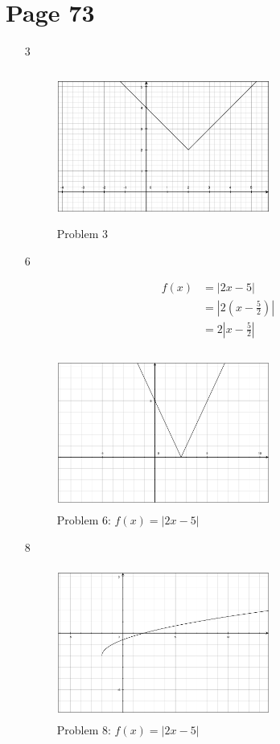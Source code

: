 \documentclass[fleqn,addpoints]{exam}
\begin{document}
\section{Page 73}
\begin{itemize}

\item[3]
\begin{figure}[H]
  \centering
  \includegraphics[width=7cm,height=5cm]{1.9-3.eps}
  \caption*{Problem 3}
\end{figure}

\item[6]

\begin{align*}
  f(x) &= |2x-5| \\
  &= \left| 2 \left( x-\frac{5}{2} \right) \right| \\
  &= 2 \left| x-\frac{5}{2} \right| \\
\end{align*}

\begin{figure}[H]
  \centering
  \includegraphics[width=7cm,height=5cm]{1.9-6.eps}
  \caption*{Problem 6: $f(x) = |2x-5|$}
\end{figure}

\item[8]
\begin{figure}[H]
  \centering
  \includegraphics[width=7cm,height=5cm]{1.9-8.eps}
  \caption*{Problem 8: $f(x) = |2x-5|$}
\end{figure}


\end{itemize}
\end{document}
